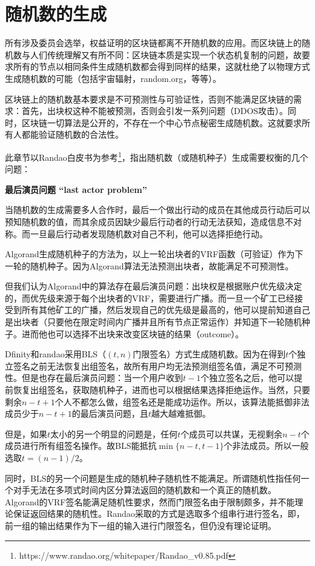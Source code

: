 \section{随机数的生成}
\label{ch:random_number}
所有涉及委员会选举，权益证明的区块链都离不开随机数的应用。而区块链上的随机数与人们传统理解又有所不同：区块链本质是实现一个状态机复制的问题，故要求所有的节点以相同条件生成随机数都会得到同样的结果，这就杜绝了以物理方式生成随机数的可能（包括宇宙辐射，random.org，等等）。

区块链上的随机数基本要求是不可预测性与可验证性，否则不能满足区块链的需求：首先，出块权这种不能被预测，否则会引发一系列问题（DDOS攻击）。同时，区块链一切算法是公开的，不存在一个中心节点秘密生成随机数。这就要求所有人都能验证随机数的合法性。	

此章节以Randao白皮书为参考\footnote{https://www.randao.org/whitepaper/Randao\_v0.85.pdf}，指出随机数（或随机种子）生成需要权衡的几个问题：

\textbf{最后演员问题 “last actor problem”}

当随机数的生成需要多人合作时，最后一个做出行动的成员在其他成员行动后可以预知随机数的值，而其余成员因缺少最后行动者的行动无法获知，造成信息不对称。而一旦最后行动者发现随机数对自己不利，他可以选择拒绝行动。

Algorand生成随机种子的方法为，以上一轮出块者的VRF函数（可验证）作为下一轮的随机种子。因为Algorand算法无法预测出块者，故能满足不可预测性。

但我们认为Algorand中的算法存在最后演员问题：出块权是根据账户优先级决定的，而优先级来源于每个出块者的VRF，需要进行广播。而一旦一个矿工已经接受到所有其他矿工的广播，然后发现自己的优先级是最高的，他可以提前知道自己是出块者（只要他在限定时间内广播并且所有节点正常运作）并知道下一轮随机种子。进而他也可以选择不出块来改变区块链的结果（outcome）。

Dfinity和randao采用BLS（$(t,n)$门限签名）方式生成随机数。因为在得到$t$个独立签名之前无法恢复出组签名，故所有用户均无法预测组签名值，满足不可预测性。但是也存在最后演员问题：当一个用户收到$t-1$个独立签名之后，他可以提前恢复出组签名，获取随机种子，进而也可以根据结果选择拒绝运作。当然，只要剩余$n-t+1$个人不都怎么做，组签名还是能成功运作。所以，该算法能抵御非法成员少于$n-t+1$的最后演员问题，且$t$越大越难抵御。

但是，如果$t$太小的另一个明显的问题是，任何$t$个成员可以共谋，无视剩余$n-t$个成员进行所有组签名操作。故BLS能抵抗$\min\{ n-t,t-1\}$个非法成员。所以一般选取$t=(n-1)/2$。

同时，BLS的另一个问题是生成的随机种子随机性不能满足。所谓随机性指任何一个对手无法在多项式时间内区分算法返回的随机数和一个真正的随机数。Algorand的VRF签名能满足随机性要求，然而门限签名由于限制颇多，并不能理论保证返回结果的随机性。Randao采取的方式是选取多个组串行进行签名，即，前一组的输出结果作为下一组的输入进行门限签名，但仍没有理论证明。

	

